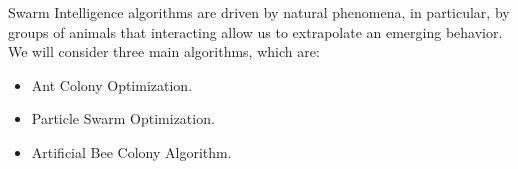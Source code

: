 Swarm Intelligence algorithms are driven by natural phenomena, in particular, by groups of animals that interacting allow us to extrapolate an emerging behavior. We will consider
three main algorithms, which are:
\begin{itemize}[nosep]
    \renewcommand{\labelitemi}{-}
    \item Ant Colony Optimization.
    \item Particle Swarm Optimization.
    \item Artificial Bee Colony Algorithm.
\end{itemize}